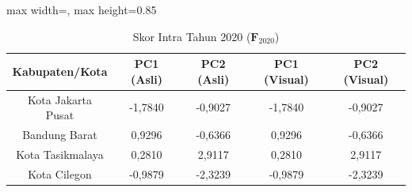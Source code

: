 \begin{table}[H]
\centering
\caption{Skor Intra Tahun 2020 ($\mathbf{F}_{2020}$)} \label{tab:sample1skor_intra_2020}
\begin{adjustbox}{max width=\textwidth, max height=0.85\textheight}
\begin{tabular}{|c|c|c|c|c|}
\hline
\textbf{Kabupaten/Kota} & \textbf{PC1 (Asli)} & \textbf{PC2 (Asli)} & \textbf{PC1 (Visual)} & \textbf{PC2 (Visual)} \\
\hline
Kota Jakarta Pusat & -1,7840 & -0,9027 & -1,7840 & -0,9027 \\
Bandung Barat & 0,9296 & -0,6366 & 0,9296 & -0,6366 \\
Kota Tasikmalaya & 0,2810 & 2,9117 & 0,2810 & 2,9117 \\
Kota Cilegon & -0,9879 & -2,3239 & -0,9879 & -2,3239 \\
\hline
\end{tabular}
\end{adjustbox}
\end{table}
